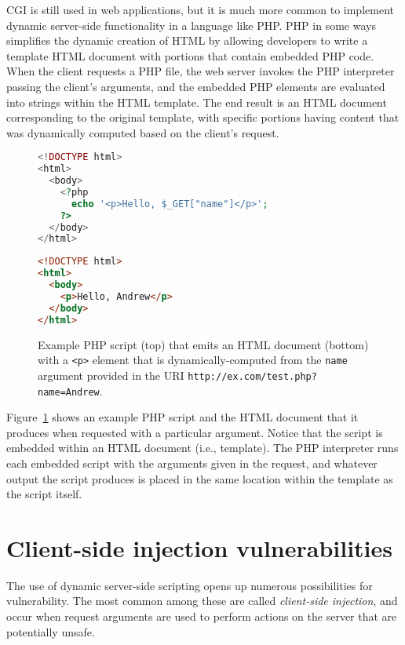 \documentclass[11pt,twoside]{scrartcl}
\begin{document}
CGI is still used in web applications, but it is much more common to implement dynamic server-side functionality in a language like PHP. PHP in some ways simplifies the dynamic creation of HTML by allowing developers to write a template HTML document with portions that contain embedded PHP code. When the client requests a PHP file, the web server invokes the PHP interpreter passing the client's arguments, and the embedded PHP elements are evaluated into strings within the HTML template. The end result is an HTML document corresponding to the original template, with specific portions having content that was dynamically computed based on the client's request.

\begin{figure}
\begin{lstlisting}[language=PHP]
<!DOCTYPE html>
<html>
  <body>
    <?php 
      echo '<p>Hello, $_GET["name"]</p>'; 
    ?>
  </body>
</html>
\end{lstlisting}

\begin{lstlisting}[language=HTML]
<!DOCTYPE html>
<html>
  <body>
    <p>Hello, Andrew</p>
  </body>
</html>
\end{lstlisting}

\caption{\label{fig:php} Example PHP script (top) that emits an HTML document (bottom) with a \texttt{<p>} element that is dynamically-computed from the \texttt{name} argument provided in the URI \nolinkurl{http://ex.com/test.php?name=Andrew}.}
\end{figure}

Figure~\ref{fig:php} shows an example PHP script and the HTML document that it produces when requested with a particular argument. Notice that the script is embedded within an HTML document (i.e., template). The PHP interpreter runs each embedded script with the arguments given in the request, and whatever output the script produces is placed in the same location within the template as the script itself.

\section{Client-side injection vulnerabilities}

The use of dynamic server-side scripting opens up numerous possibilities for vulnerability. The most common among these are called \emph{client-side injection}, and occur when request arguments are used to perform actions on the server that are potentially unsafe. 
\end{document}
